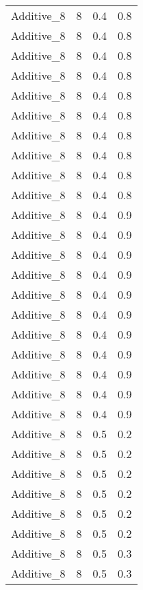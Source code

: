 \documentclass{article}
\begin{document}
\begin{longtable}[H]{lrrr}
 Additive\_8 &       8 &   0.4 &            0.8 \\
 Additive\_8 &       8 &   0.4 &            0.8 \\
 Additive\_8 &       8 &   0.4 &            0.8 \\
 Additive\_8 &       8 &   0.4 &            0.8 \\
 Additive\_8 &       8 &   0.4 &            0.8 \\
 Additive\_8 &       8 &   0.4 &            0.8 \\
 Additive\_8 &       8 &   0.4 &            0.8 \\
 Additive\_8 &       8 &   0.4 &            0.8 \\
 Additive\_8 &       8 &   0.4 &            0.8 \\
 Additive\_8 &       8 &   0.4 &            0.8 \\
 Additive\_8 &       8 &   0.4 &            0.9 \\
 Additive\_8 &       8 &   0.4 &            0.9 \\
 Additive\_8 &       8 &   0.4 &            0.9 \\
 Additive\_8 &       8 &   0.4 &            0.9 \\
 Additive\_8 &       8 &   0.4 &            0.9 \\
 Additive\_8 &       8 &   0.4 &            0.9 \\
 Additive\_8 &       8 &   0.4 &            0.9 \\
 Additive\_8 &       8 &   0.4 &            0.9 \\
 Additive\_8 &       8 &   0.4 &            0.9 \\
 Additive\_8 &       8 &   0.4 &            0.9 \\
 Additive\_8 &       8 &   0.4 &            0.9 \\
 Additive\_8 &       8 &   0.5 &            0.2 \\
 Additive\_8 &       8 &   0.5 &            0.2 \\
 Additive\_8 &       8 &   0.5 &            0.2 \\
 Additive\_8 &       8 &   0.5 &            0.2 \\
 Additive\_8 &       8 &   0.5 &            0.2 \\
 Additive\_8 &       8 &   0.5 &            0.2 \\
 Additive\_8 &       8 &   0.5 &            0.3 \\
 Additive\_8 &       8 &   0.5 &            0.3 \\

\end{longtable}
\end{document}
